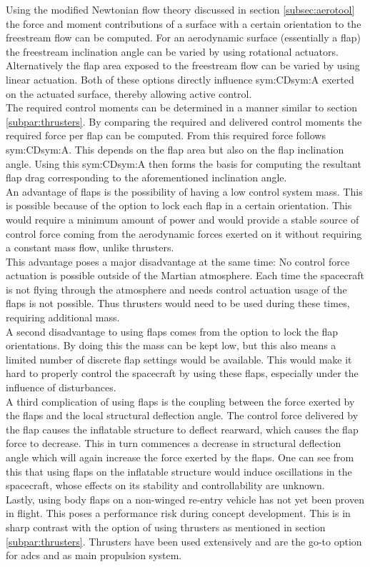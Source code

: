 Using the modified Newtonian flow theory discussed in section \ref{subsec:aerotool} the force and moment contributions of a surface with a certain orientation to the freestream flow can be computed. For an aerodynamic surface (essentially a flap) the freestream inclination angle can be varied by using rotational actuators. Alternatively the flap area exposed to the freestream flow can be varied by using linear actuation. Both of these options directly influence \gls{sym:CD}\gls{sym:A} exerted on the actuated surface, thereby allowing active control.\\
The required control moments can be determined in a manner similar to section \ref{subpar:thrusters}. By comparing the required and delivered control moments the required force per flap can be computed. From this required force follows \gls{sym:CD}\gls{sym:A}. This depends on the flap area but also on the flap inclination angle. Using this \gls{sym:CD}\gls{sym:A} then forms the basis for computing the resultant flap drag corresponding to the aforementioned inclination angle.\\
An advantage of flaps is the possibility of having a low control system mass. This is possible because of the option to lock each flap in a certain orientation. This would require a minimum amount of power and would provide a stable source of control force coming from the aerodynamic forces exerted on it without requiring a constant mass flow, unlike thrusters.\\
This advantage poses a major disadvantage at the same time: No control force actuation is possible outside of the Martian atmosphere. Each time the spacecraft is not flying through the atmosphere and needs control actuation usage of the flaps is not possible. Thus thrusters would need to be used during these times, requiring additional mass.\\
A second disadvantage to using flaps comes from the option to lock the flap orientations. By doing this the mass can be kept low, but this also means a limited number of discrete flap settings would be available. This would make it hard to properly control the spacecraft by using these flaps, especially under the influence of disturbances.\\
A third complication of using flaps is the coupling between the force exerted by the flaps and the local structural deflection angle. The control force delivered by the flap causes the inflatable structure to deflect rearward, which causes the flap force to decrease. This in turn commences a decrease in structural deflection angle which will again increase the force exerted by the flaps. One can see from this that using flaps on the inflatable structure would induce oscillations in the spacecraft, whose effects on its stability and controllability are unknown.\\
Lastly, using body flaps on a non-winged re-entry vehicle has not yet been proven in flight. This poses a performance risk during concept development. This is in sharp contrast with the option of using thrusters as mentioned in section \ref{subpar:thrusters}. Thrusters have been used extensively and are the go-to option for \gls{adcs} and as main propulsion system.
